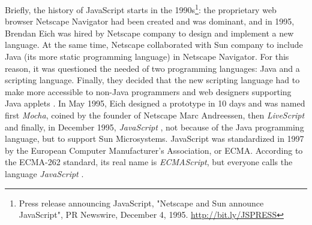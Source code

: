 \documentclass{article}
\begin{document}
Briefly, the history of JavaScript starts in the 1990s\footnote{Press release announcing JavaScript, "Netscape and Sun announce JavaScript", PR Newswire, December 4, 1995. \url{http://bit.ly/JSPRESS}}: the proprietary web browser Netscape Navigator had been created and was dominant, and in 1995, Brendan Eich was hired by Netscape company to design and implement a new language. At the same time, Netscape collaborated with Sun company to include Java (its more static programming language) in Netscape Navigator. For this reason, it was questioned the needed of two programming languages: Java and a scripting language. Finally, they decided that the new scripting language had to make more accessible to non-Java programmers and web designers %
supporting Java applets \cite{Champeon08}. In May 1995, Eich designed a prototype in 10 days and was named first \emph{Mocha}, coined by the founder of Netscape Marc Andreessen, then \emph{LiveScript} and finally, in December 1995, \emph{JavaScript} \cite{Eich2010}, not because of the Java programming language, but to support Sun Microsystems.
JavaScript was standardized in 1997 by the European Computer Manufacturer's Association, or ECMA. According to the ECMA-262 standard, its real name is \emph{ECMAScript}, but everyone calls the language \emph{JavaScript} \cite{Flanagan06}.


\end{document}
